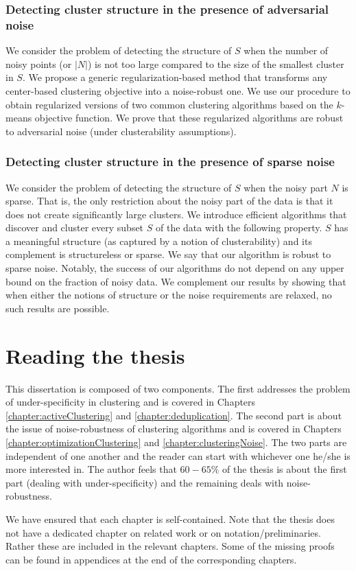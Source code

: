 \documentclass[12pt]{article}
\begin{document}
\subsubsection*{Detecting cluster structure in the presence of adversarial noise}
We consider the problem of detecting the structure of $S$ when the number of noisy points (or $|N|$) is not too large compared to the size of the smallest cluster in $S$. We propose a generic regularization-based method that transforms any center-based clustering objective into a noise-robust one. We use our procedure to obtain regularized versions of two common clustering algorithms based on the $k$-means objective function. We prove that these regularized algorithms are robust to adversarial noise (under clusterability assumptions).


\subsubsection*{Detecting cluster structure in the presence of sparse noise}
We consider the problem of detecting the structure of $S$ when the noisy part $N$ is sparse. That is, the only restriction about the noisy part of the data is that it does not create significantly large clusters. We introduce efficient algorithms that discover and cluster every subset $S$ of the data with the following property. $S$ has a meaningful structure (as captured by a notion of clusterability) and its complement is structureless or sparse. We say that our algorithm is robust to sparse noise. Notably, the success of our algorithms do not depend on any upper bound on the fraction of noisy data. We complement our results by showing that when either the notions of structure or the noise requirements are relaxed, no such results are possible.

\section{Reading the thesis}
This dissertation is composed of two components. The first addresses the problem of under-specificity in clustering and is covered in Chapters \ref{chapter:activeClustering} and \ref{chapter:deduplication}. The second part is about the issue of noise-robustness of clustering algorithms and is covered in Chapters \ref{chapter:optimizationClustering} and \ref{chapter:clusteringNoise}. The two parts are independent of one another and the reader can start with whichever one he/she is more interested in. The author feels that $60-65\%$ of the thesis is about the first part (dealing with under-specificity) and the remaining deals with noise-robustness. 

We have ensured that each chapter is self-contained. Note that the thesis does not have a dedicated chapter on related work or on notation/preliminaries. Rather these are included in the relevant chapters. Some of the missing proofs can be found in appendices at the end of the corresponding chapters.
  
\ifdefined\COMPLETE
\else
\end{document}
